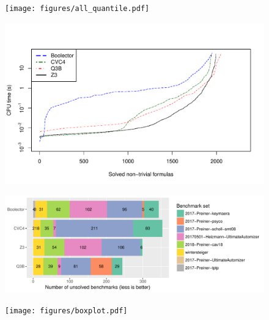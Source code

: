 \documentclass[a4paper]{article}
\begin{document}










\begin{figure}[h]
  \texttt{[image: figures/all\_quantile.pdf]}
  \label{fig:nontrivialQuantile}
\end{figure}

\begin{figure}
  \includegraphics[width=\textwidth]{figures/all_trivial_quantile.pdf}
  \label{fig:quantile}
\end{figure}

\begin{figure}
  \includegraphics[width=\textwidth]{figures/unsolved.pdf}
  \label{fig:unsolved}
\end{figure}

\begin{figure}
  \texttt{[image: figures/boxplot.pdf]}
  \label{fig:boxplot}
\end{figure}
\end{document}
